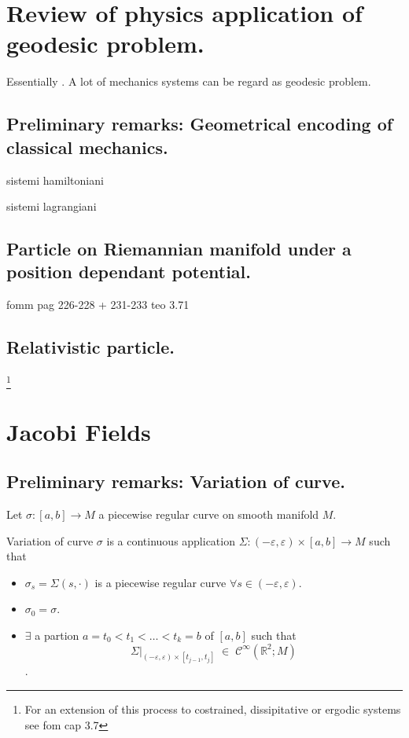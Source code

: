 \documentclass[a4paper,12pt]{scrartcl}    %
\begin{document}
\newpage
\section{Review of physics application of geodesic problem.}
Essentially \cite{Abraham1978}.
\vspace{6mm}
A lot of mechanics systems can be regard as geodesic problem.

\subsection{Preliminary remarks: Geometrical encoding of classical mechanics.}
    sistemi hamiltoniani

    sistemi lagrangiani
    
\subsection{Particle on Riemannian manifold under a position dependant potential.}	
	fomm pag 226-228 + 231-233       teo 3.71
 
    
    
\subsection{Relativistic particle.}
	\footnote{For an extension of this process to costrained, dissipitative or ergodic systems see fom cap 3.7}


\newpage
\section{Jacobi Fields}

\subsection{Preliminary remarks: Variation of curve.}
Let $\sigma:[a,b]\rightarrow M$ a piecewise regular curve on smooth manifold $M$.

 \begin{definition}
  Variation of curve $\sigma$ is a continuous application $\Sigma: (-\varepsilon, \varepsilon) \times [a,b] \rightarrow M$ such that
  \begin{itemize}
   \item $\sigma_s = \Sigma(s, \cdot)$ is a piecewise regular curve $\forall s \in  (-\varepsilon, \varepsilon)$.
   \item $\sigma_0 = \sigma$.
   \item $\exists$ a partion $ a= t_0 < t_1 < \ldots < t_k=b$ of $[a,b]$ such that 
   $$ \Sigma \big \vert_{(-\varepsilon, \varepsilon) \times [t_{j-1},t_{j}]}\; \in \; \mathcal{C}^\infty(\mathbb{R}^2; M)$$.
  \end{itemize}
 \end{definition}
 
\end{document}
